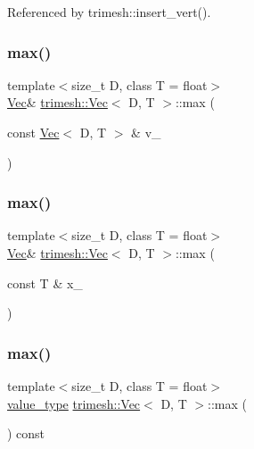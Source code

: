 Referenced by trimesh\+::insert\+\_\+vert().

\mbox{\label{classtrimesh_1_1Vec_aa59364715c73bbd0385fcf5c8e195faf}} 
\subsubsection{\texorpdfstring{max()}{max()}\hspace{0.1cm}{\footnotesize\ttfamily [1/3]}}
{\footnotesize\ttfamily template$<$size\+\_\+t D, class T = float$>$ \\
\hyperlink{classtrimesh_1_1Vec}{Vec}\& \hyperlink{classtrimesh_1_1Vec}{trimesh\+::\+Vec}$<$ D, T $>$\+::max (\begin{DoxyParamCaption}\item[{const \hyperlink{classtrimesh_1_1Vec}{Vec}$<$ D, T $>$ \&}]{v\+\_\+ }\end{DoxyParamCaption})\hspace{0.3cm}{\ttfamily [inline]}}

\mbox{\label{classtrimesh_1_1Vec_a71c0b380591e02c8571bdac24b246ae2}} 
\subsubsection{\texorpdfstring{max()}{max()}\hspace{0.1cm}{\footnotesize\ttfamily [2/3]}}
{\footnotesize\ttfamily template$<$size\+\_\+t D, class T = float$>$ \\
\hyperlink{classtrimesh_1_1Vec}{Vec}\& \hyperlink{classtrimesh_1_1Vec}{trimesh\+::\+Vec}$<$ D, T $>$\+::max (\begin{DoxyParamCaption}\item[{const T \&}]{x\+\_\+ }\end{DoxyParamCaption})\hspace{0.3cm}{\ttfamily [inline]}}

\mbox{\label{classtrimesh_1_1Vec_ae01b6e7bf762b2f6828f838c0098024f}} 
\subsubsection{\texorpdfstring{max()}{max()}\hspace{0.1cm}{\footnotesize\ttfamily [3/3]}}
{\footnotesize\ttfamily template$<$size\+\_\+t D, class T = float$>$ \\
\hyperlink{classtrimesh_1_1Vec_a10a59253996e42d67c713f37592669df}{value\+\_\+type} \hyperlink{classtrimesh_1_1Vec}{trimesh\+::\+Vec}$<$ D, T $>$\+::max (\begin{DoxyParamCaption}{ }\end{DoxyParamCaption}) const\hspace{0.3cm}{\ttfamily [inline]}}

